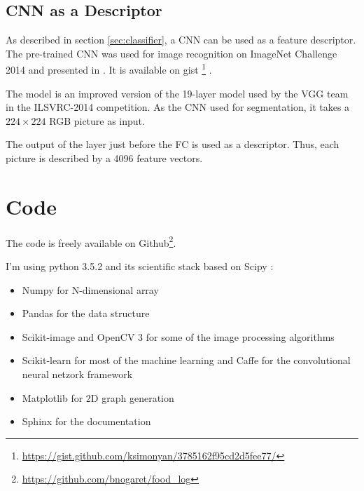 \subsection{CNN as a Descriptor}

As described in section \ref{sec:classifier}, a CNN can be used as a feature descriptor. The pre-trained CNN was used for image recognition on ImageNet Challenge 2014 and presented in  \cite{Simonyan2014}. It is available on gist  \footnote{\url{https://gist.github.com/ksimonyan/3785162f95cd2d5fee77/}} .

The model is an improved version of the 19-layer model used by the VGG team in the ILSVRC-2014 competition. As the CNN used for segmentation, it takes a $224 \times 224$ RGB picture as input.

The output of the layer just before the FC is used as a descriptor. Thus, each picture is described by a 4096 feature vectors.

\section{Code}

The code is freely available on Github\footnote{\url{https://github.com/bnogaret/food_log}}.

I'm using python 3.5.2 and its scientific stack based on Scipy \cite{Oliphant2007}:
\begin{itemize}
    \item Numpy \cite{VanDerWalt2011} for N-dimensional array
    \item Pandas \cite{McKinney2010} for the data structure
    \item Scikit-image \cite{VanderWalt2014} and OpenCV 3 \cite{Bradski2000} for some of the image processing algorithms
    \item Scikit-learn \cite{Pedregosa2012} for most of the machine learning and Caffe \cite{Jia2014a} for the convolutional neural netzork framework
    \item Matplotlib \cite{Hunter2007} for 2D graph generation
    \item Sphinx for the documentation
\end{itemize}
